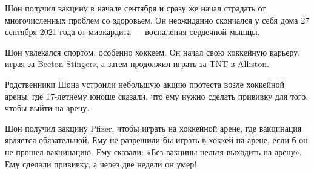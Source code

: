 Шон получил вакцину в начале сентября и сразу же начал страдать от
многочисленных проблем со здоровьем. Он неожиданно скончался у себя дома 27
сентября 2021 года от миокардита — воспаления сердечной мышцы.

Шон увлекался спортом, особенно хоккеем. Он начал свою хоккейную карьеру, играя
за Beeton Stingers, а затем продолжил играть за TNT в Alliston.

Родственники Шона устроили небольшую акцию протеста возле хоккейной арены, где
17-летнему юноше сказали, что ему нужно сделать прививку для того, чтобы выйти
на арену.

Шон получил вакцину Pfizer, чтобы играть на хоккейной арене, где вакцинация
является обязательной. Ему не разрешили бы играть в хоккей на арене, если б он
не прошел вакцинацию. Ему сказали: «Без вакцины нельзя выходить на арену». Ему
сделали прививку, а через две недели он умер!
